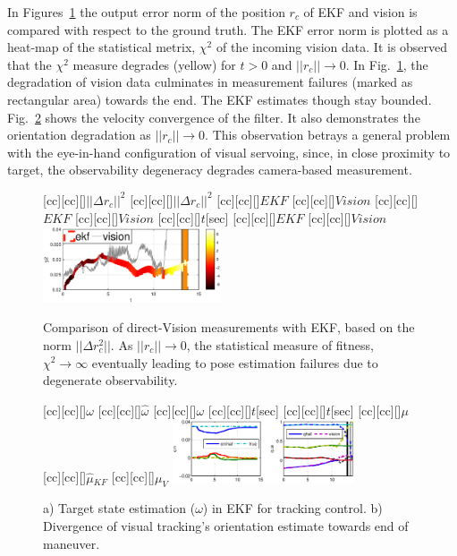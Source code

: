 In Figures~\ref{fig:fig_norm_errors} the output error norm of the position $r_c$ of EKF and vision is compared with respect to the ground truth. The EKF error norm is plotted as a heat-map of the statistical metrix, $\chi^2$ of the incoming vision data. It is observed that the $\chi^2$ measure degrades (yellow) for $t > 0 $ and $||r_c|| \rightarrow 0 $. In Fig.~\ref{fig:fig_norm_errors}, the degradation of vision data culminates in measurement failures (marked as rectangular area) towards the end. The EKF estimates though stay bounded. Fig.~\ref{fig:states_EKF} shows the velocity convergence of the filter. It also demonstrates the orientation degradation as $||r_c|| \rightarrow 0$. This observation betrays a general problem with the eye-in-hand configuration of visual servoing, since, in close proximity to target, the observability degeneracy degrades camera-based measurement. 
%
\begin{figure}[t!]
[cc][cc][\FontFigB]{$||\Delta r_c||^2$}
[cc][cc][\FontFigB]{$||\Delta r_c||^2$}
[cc][cc][\FontFigM]{$EKF$}
[cc][cc][\FontFigM]{$Vision$}
[cc][cc][\FontFigM]{$EKF$}
[cc][cc][\FontFigM]{$Vision$}
[cc][cc][\FontFigB]{$t$[sec]}
[cc][cc][\FontFigM]{$EKF$}
[cc][cc][\FontFigM]{$Vision$}
\centering\includegraphics[angle=0,width=0.47\textwidth]{./figures/fig_norm_errors}
\caption{Comparison of direct-Vision measurements with EKF, based on the norm $||\Delta r_c^2||$. As $||r_c|| \rightarrow 0$, the statistical measure of fitness, $\chi^2 \rightarrow \infty $ eventually leading to pose estimation failures due to degenerate observability.}
\label{fig:fig_norm_errors}
\end{figure}
%
%
\begin{figure}[t!]
[cc][cc][\FontFigB]{$\omega$}
[cc][cc][\FontFigB]{$\hat{\omega}$}
[cc][cc][\FontFigB]{$\omega$}
[cc][cc][\FontFigB]{$t$[sec]}
[cc][cc][\FontFigB]{$t$[sec]}
[cc][cc][\FontFigB]{$\mu$}
[cc][cc][\FontFigB]{$\hat{\mu}{}_{KF}$}
[cc][cc][\FontFigB]{$\mu_V$}
\centering\includegraphics[angle=0,width=0.48\textwidth]{./figures/states_EKF}
\caption{a) Target state estimation ($\omega$) in EKF for tracking control. b) Divergence of visual tracking's orientation estimate towards end of maneuver.}
\label{fig:states_EKF}
\end{figure}
%
